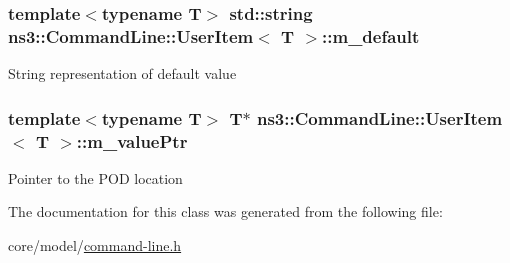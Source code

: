 \subsubsection[{\texorpdfstring{m\+\_\+default}{m_default}}]{\setlength{\rightskip}{0pt plus 5cm}template$<$typename T$>$ std\+::string {\bf ns3\+::\+Command\+Line\+::\+User\+Item}$<$ T $>$\+::m\+\_\+default}\hypertarget{classns3_1_1CommandLine_1_1UserItem_a0e5ee26cfa7f97437ef7b04065144027}{}\label{classns3_1_1CommandLine_1_1UserItem_a0e5ee26cfa7f97437ef7b04065144027}
String representation of default value 
\subsubsection[{\texorpdfstring{m\+\_\+value\+Ptr}{m_valuePtr}}]{\setlength{\rightskip}{0pt plus 5cm}template$<$typename T$>$ T$\ast$ {\bf ns3\+::\+Command\+Line\+::\+User\+Item}$<$ T $>$\+::m\+\_\+value\+Ptr}\hypertarget{classns3_1_1CommandLine_1_1UserItem_ac07a831897e30a5f366a18193399e065}{}\label{classns3_1_1CommandLine_1_1UserItem_ac07a831897e30a5f366a18193399e065}
Pointer to the P\+OD location 

The documentation for this class was generated from the following file\+:\begin{DoxyCompactItemize}
\item 
core/model/\hyperlink{command-line_8h}{command-\/line.\+h}\end{DoxyCompactItemize}
